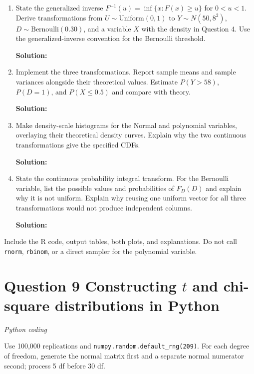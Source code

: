 \documentclass[11pt]{article}
\newcommand{\solution}{\par\medskip\noindent\textbf{Solution:}\par\vspace{0cm}}
\begin{document}
\begin{enumerate}[label=\textbf{(\alph*)}]
  \item State the generalized inverse $F^{-1}(u) = \inf\{x : F(x) \geq u\}$ for $0 < u < 1$. Derive transformations from $U \sim \text{Uniform}(0, 1)$ to $Y \sim N(50, 8^2)$, $D \sim \text{Bernoulli}(0.30)$, and a variable $X$ with the density in Question 4. Use the generalized-inverse convention for the Bernoulli threshold.
  \solution

  \item Implement the three transformations. Report sample means and sample variances alongside their theoretical values. Estimate $P(Y > 58)$, $P(D = 1)$, and $P(X \leq 0.5)$ and compare with theory.
  \solution

  \item Make density-scale histograms for the Normal and polynomial variables, overlaying their theoretical density curves. Explain why the two continuous transformations give the specified CDFs.
  \solution

  \item State the continuous probability integral transform. For the Bernoulli variable, list the possible values and probabilities of $F_D(D)$ and explain why it is not uniform. Explain why reusing one uniform vector for all three transformations would not produce independent columns.
  \solution
\end{enumerate}

Include the R code, output tables, both plots, and explanations. Do not call \texttt{rnorm}, \texttt{rbinom}, or a direct sampler for the polynomial variable.

\newpage
\section*{Question 9 \quad Constructing $t$ and chi-square distributions in Python}
\textit{Python coding}

Use 100,000 replications and \texttt{numpy.random.default\_rng(209)}. For each degree of freedom, generate the normal matrix first and a separate normal numerator second; process 5 df before 30 df.
\end{document}
